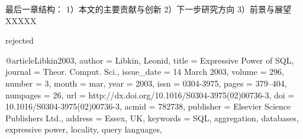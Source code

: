 最后一章结构：
1）本文的主要贡献与创新
2）下一步研究方向
3）前景与展望
XXXXX


\cite{Monteleone2013} rejected

\cite{Libkin2001}

@article{Libkin2003,
 author = {Libkin, Leonid},
 title = {Expressive Power of SQL},
 journal = {Theor. Comput. Sci.},
 issue_date = {14 March 2003},
 volume = {296},
 number = {3},
 month = mar,
 year = {2003},
 issn = {0304-3975},
 pages = {379--404},
 numpages = {26},
 url = {http://dx.doi.org/10.1016/S0304-3975(02)00736-3},
 doi = {10.1016/S0304-3975(02)00736-3},
 acmid = {782738},
 publisher = {Elsevier Science Publishers Ltd.},
 address = {Essex, UK},
 keywords = {SQL, aggregation, databases, expressive power, locality, query languages},
} 


\cite{Liang2011}

\cite{Bollacker2008}